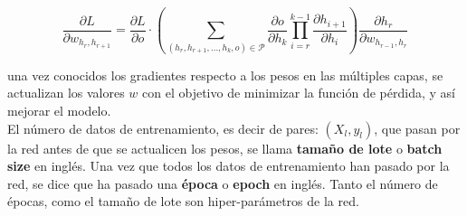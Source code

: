 \begin{equation}
  \label{eq:partialw}
  \frac{\partial L}{\partial w_{h_r, h_{r+1}}} = \frac{\partial L}{\partial o}\cdot \left( \sum_{(h_r,h_{r+1},...,h_k,o)\in \mathcal{P}}\frac{\partial o}{\partial h_k}\prod_{i=r}^{k-1}\frac{\partial h_{i+1}}{\partial h_i}\right) \frac{\partial h_r}{\partial w_{h_{r-1},h_r}}
\end{equation}

una vez conocidos los gradientes respecto a los pesos en las múltiples capas, se actualizan los valores $w$ con el objetivo de minimizar la función de pérdida, y así mejorar el modelo.\\
El número de datos de entrenamiento, es decir de pares: $(X_l,y_l)$, que pasan por la red antes de que se actualicen los pesos, se llama \textbf{tamaño de lote} o \textbf{batch size} en inglés. Una vez que todos los datos de entrenamiento han pasado por la red, se dice que ha pasado una \textbf{época} o \textbf{epoch} en inglés. Tanto el número de épocas, como el tamaño de lote son hiper-parámetros de la red.

